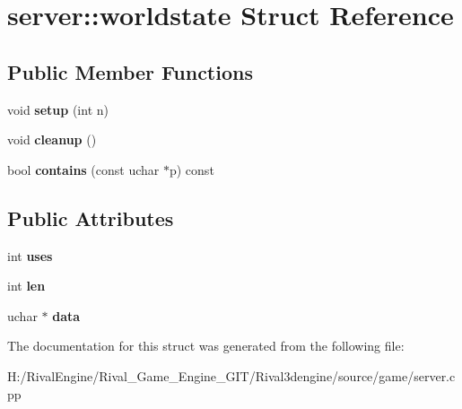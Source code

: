 \hypertarget{structserver_1_1worldstate}{}\section{server\+:\+:worldstate Struct Reference}
\label{structserver_1_1worldstate}
\subsection*{Public Member Functions}
\begin{DoxyCompactItemize}
\item 
\mbox{\label{structserver_1_1worldstate_a15bbada6361aa405ad61a4402db2e603}} 
void {\bfseries setup} (int n)
\item 
\mbox{\label{structserver_1_1worldstate_a8f8056266995ffd2afb28121d8056e90}} 
void {\bfseries cleanup} ()
\item 
\mbox{\label{structserver_1_1worldstate_a6a0183feafcbe94b6ea9351e24b8e9da}} 
bool {\bfseries contains} (const uchar $\ast$p) const
\end{DoxyCompactItemize}
\subsection*{Public Attributes}
\begin{DoxyCompactItemize}
\item 
\mbox{\label{structserver_1_1worldstate_a9deb524fd0957fc07d53358bb1367d0c}} 
int {\bfseries uses}
\item 
\mbox{\label{structserver_1_1worldstate_af984b218b44dbe4c08c56b0b8eea4c27}} 
int {\bfseries len}
\item 
\mbox{\label{structserver_1_1worldstate_a0f1fd8a385e407257a198f9ea683de15}} 
uchar $\ast$ {\bfseries data}
\end{DoxyCompactItemize}


The documentation for this struct was generated from the following file\+:\begin{DoxyCompactItemize}
\item 
H\+:/\+Rival\+Engine/\+Rival\+\_\+\+Game\+\_\+\+Engine\+\_\+\+G\+I\+T/\+Rival3dengine/source/game/server.\+cpp\end{DoxyCompactItemize}
